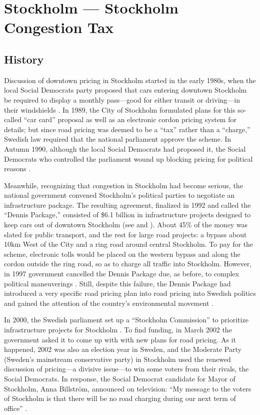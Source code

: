 \section{Stockholm --- Stockholm Congestion Tax}

\subsection{History}

Discussion of downtown pricing in Stockholm started in the early 1980s, when the local Social Democrats party proposed that cars entering downtown Stockholm be required to display a monthly pass---good for either transit or driving---in their windshields \citep{GullbergIsaksson2009,Arnott2005}. In 1989, the City of Stockholm formulated plans for this so-called ``car card'' proposal as well as an electronic cordon pricing system \citet[p. 90]{Hau1992} for details; but since road pricing was deemed to be a ``tax'' rather than a ``charge,'' Swedish law required that the national parliament approve the scheme. In Autumn 1990, although the local Social Democrats had proposed it, the Social Democrats who controlled the parliament wound up blocking pricing for political reasons \citep{Ahlstrand2001}. 

Meanwhile, recognizing that congestion in Stockholm had become serious, the national government convened Stockholm's political parties to negotiate an infrastructure package. The resulting agreement, finalized in 1992 and called the ``Dennis Package,''  consisted of \$6.1 billion in infrastructure projects designed to keep cars out of downtown Stockholm (see \citet[pp. 39-40]{Gomez-Ibanez1994} and \citet[p. 92]{Hau1992}). About 45\% of the money was slated for public transport, and the rest for large road projects: a bypass about 10km West of the City and a ring road around central Stockholm. To pay for the scheme, electronic tolls would be placed on the western bypass and along the cordon outside the ring road, so as to charge all traffic into Stockholm. However, in 1997 government cancelled the Dennis Package due, as before, to complex political maneuverings \citep{Ahlstrand2001,GullbergIsaksson2009}. Still, despite this failure, the Dennis Package had introduced a very specific road pricing plan into road pricing into Swedish politics and gained the attention of the country's environmental movement \citep[p.3]{Eliasson2014b}.

In 2000, the Swedish parliament set up a ``Stockholm Commission'' to  prioritize infrastructure projects for Stockholm \citep{Eliasson2009b}. To find funding, in March 2002 the government asked it to come up with with new plans for road pricing. As it happened, 2002 was also an election year in Sweden, and the Moderate Party (Sweden's mainstream conservative party) in Stockholm used the renewed discussion of pricing---a divisive issue---to win some voters from their rivals, the Social Democrats. In response, the Social Democrat candidate for Mayor of Stockholm, Anna Billstr\"om, announced on television: ``My message to the voters of Stockholm is that there will be no road charging during our next term of office'' \citep{GullbergIsaksson2009}.

